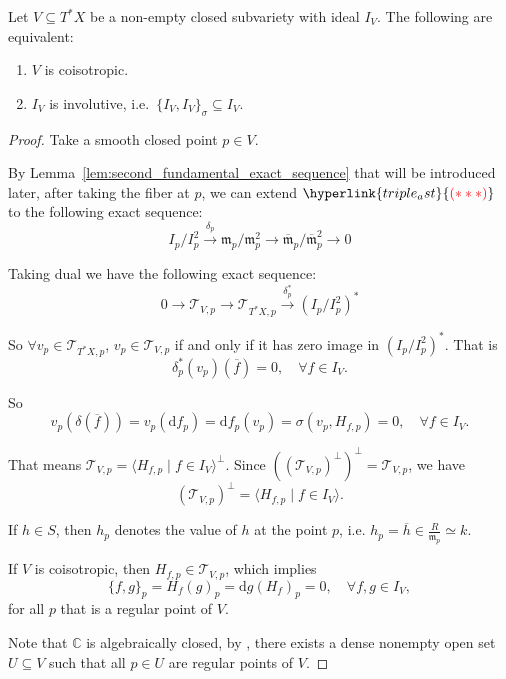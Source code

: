 \begin{theorem}\label{thm:coisotropic-iff-involutive}
    Let $V\subseteq T^\ast X$ be a non-empty closed subvariety with ideal $I_V$.  The
    following are equivalent:
    \begin{enumerate}
        \item $V$ is coisotropic.
        \item $I_V$ is involutive, i.e.\ $\{I_V,I_V\}_\sigma\subseteq I_V$.
    \end{enumerate}
\end{theorem}
\begin{proof}
    Take a smooth closed point $p \in V$.

    By Lemma~\ref{lem:second_fundamental_exact_sequence} that will be introduced later, after taking the fiber at $p$, we can extend $\hyperlink{triple_ast}{\textcolor{red}{(* * *)}}$
    to the following exact sequence:
    \[
        I_p/I_p^2 \xrightarrow{\delta_p} \mathfrak m_p/\mathfrak m_p^2 \rightarrow \overline{\mathfrak m}_p/\overline{\mathfrak m}_p^2 \rightarrow 0
    \]

    Taking dual we have the following exact sequence:
    \[
        0 \rightarrow \mathcal{T}_{V,p} \rightarrow \mathcal{T}_{T^{\ast}X, p} \xrightarrow{\delta^{\ast}_p} (I_p/I_p^2)^{\ast}
    \]

    So $\forall v_p \in \mathcal{T}_{T^{\ast}X, p}$, $v_p\in \mathcal{T}_{V,p}$ if and only if it has zero image in $(I_p/I_p^2)^{\ast}$. That is
    \[
        \delta^{\ast}_p(v_p)(\overline{f}) = 0, \quad \forall f \in I_V.
    \]

    So
    \[
        v_p(\delta(\overline{f}))=v_p(\text{d}f_p)=\text{d}f_p(v_p)=\sigma(v_p, H_{f,p})=0, \quad \forall f \in I_V.
    \]

    That means $\mathcal{T}_{V,p}=\langle H_{f,p} \mid f \in I_V\rangle^\perp$. Since $((\mathcal{T}_{V,p})^\perp)^\perp = \mathcal{T}_{V,p}$, we have
    \[
        (\mathcal{T}_{V,p})^\perp=\langle H_{f,p} \mid f \in I_V \rangle.
    \]

    If $h \in S$, then $h_p$ denotes the value of $h$ at the point $p$, i.e. $h_p = \overline{h} \in \frac{R}{\mathfrak{m}_p} \simeq k$.

    If $V$ is coisotropic, then $H_{f,p} \in \mathcal{T}_{V,p}$, which implies
    \[
        \{f, g\}_p = H_f(g)_p = \text{d}g(H_f)_p = 0,\quad \forall f, g\in I_V,
    \]
    for all $p$ that is a regular point of $V$.

    Note that $\mathbb{C}$ is algebraically closed, by \cite[Chap.~4, Lem.~2.21. and Prop.~2.24.]{liu2002algebraic}, there exists a dense nonempty open set $U \subseteq V$ such that all $p \in U$ are regular points of $V$.


\end{proof}
